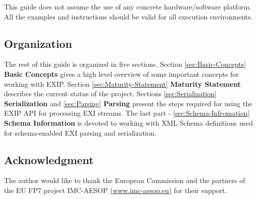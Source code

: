 This guide does not assume the use of any concrete hardware/software platform. All the examples and instructions
should be valid for all execution environments.

\subsection{Organization}
\label{sec:organization}

The rest of this guide is organized in five sections. Section \ref{sec:Basic-Concepts} \textbf{Basic Concepts}
gives a high level overview of some important concepts for working with EXIP. Section \ref{sec:Maturity-Statement} \textbf{Maturity Statement}
describes the current status of the project. Sections \ref{sec:Serialization} \textbf{Serialization} and 
\ref{sec:Parsing} \textbf{Parsing} present the steps required for using the EXIP API for processing EXI streams.
The last part - \ref{sec:Schema-Infromation} \textbf{Schema Information} is devoted to working with XML Schema
definitions used for schema-enabled EXI parsing and serialization.

\subsection{Acknowledgment}
\label{sec:acknowledgment}
The author would like to thank the European Commission
and the partners of the EU FP7 project IMC-AESOP \href{http://www.imc-aesop.eu}{(www.imc-aesop.eu)}
for their support.